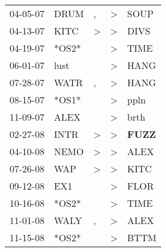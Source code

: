 \begin{supertabular}{p{0.07\textwidth}p{0.06\textwidth}p{0.02\textwidth}p{0.02\textwidth}p{0.06\textwidth}}
          04-05-07\textsuperscript{} &           DRUM\textsuperscript{} &                , &     \textgreater &           SOUP\textsuperscript{} \\
          04-13-07\textsuperscript{} &           KITC\textsuperscript{} &     \textgreater &     \textgreater &           DIVS\textsuperscript{} \\
          04-19-07\textsuperscript{} &                            *OS2* &                  &     \textgreater &           TIME\textsuperscript{} \\
          06-01-07\textsuperscript{} &           lust\textsuperscript{} &                  &     \textgreater &           HANG\textsuperscript{} \\
          07-28-07\textsuperscript{} &           WATR\textsuperscript{} &                , &     \textgreater &           HANG\textsuperscript{} \\
          08-15-07\textsuperscript{} &                            *OS1* &                  &     \textgreater &           ppln\textsuperscript{} \\
          11-09-07\textsuperscript{} &           ALEX\textsuperscript{} &                  &     \textgreater &           brth\textsuperscript{} \\
          02-27-08\textsuperscript{} &           INTR\textsuperscript{} &     \textgreater &     \textgreater &  \textbf{FUZZ\textsuperscript{}} \\
          04-10-08\textsuperscript{} &           NEMO\textsuperscript{} &     \textgreater &     \textgreater &           ALEX\textsuperscript{} \\
          07-26-08\textsuperscript{} &            WAP\textsuperscript{} &     \textgreater &     \textgreater &           KITC\textsuperscript{} \\
          09-12-08\textsuperscript{} &            EX1\textsuperscript{} &                  &     \textgreater &           FLOR\textsuperscript{} \\
          10-16-08\textsuperscript{} &                            *OS2* &                  &     \textgreater &           TIME\textsuperscript{} \\
          11-01-08\textsuperscript{} &           WALY\textsuperscript{} &                , &     \textgreater &           ALEX\textsuperscript{} \\
          11-15-08\textsuperscript{} &                            *OS2* &                  &     \textgreater &           BTTM\textsuperscript{} \\

\end{supertabular}
